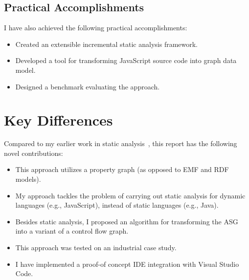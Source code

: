 \subsection{Practical Accomplishments}
I have also achieved the following practical accomplishments:

\begin{itemize}[topsep=0pt]
	\item Created an extensible incremental static analysis framework.
	\item Developed a tool for transforming JavaScript source code into graph data model.
	\item Designed a benchmark evaluating the approach.
\end{itemize}

\section{Key Differences}
Compared to my earlier work in static analysis~\cite{stein-daniel-tdk,stein-daniel-bsc,stein-daniel-ttc}, this report has the following novel contributions:

\begin{itemize}[topsep=0pt]
	\item This approach utilizes a property graph (as opposed to EMF and RDF models).

	\item My approach tackles the problem of carrying out static analysis for dynamic languages (e.g., JavaScript), instead of static languages (e.g., Java).

	\item Besides static analysis, I proposed an algorithm for transforming the ASG into a variant of a control flow graph.

	\item This approach was tested on an industrial case study.

	\item I have implemented a proof-of concept IDE integration with Visual Studio Code.
\end{itemize}

